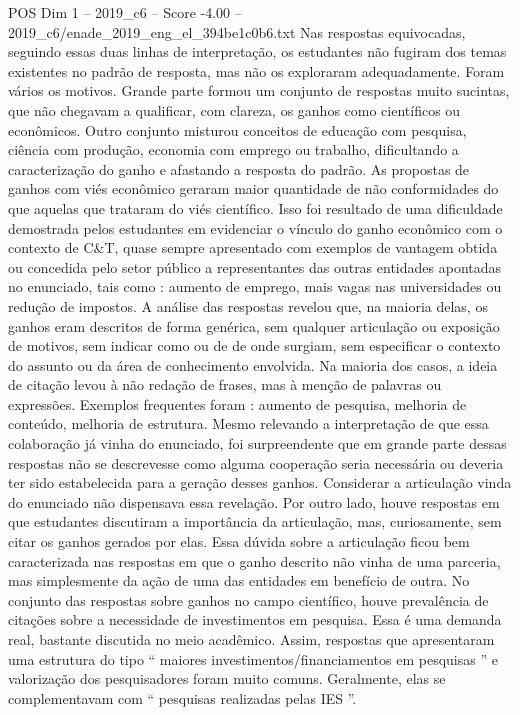 \begin{textsample}{POS Dim 1 – 2019\_c6 – Score -4.00 – 2019\_c6/enade\_2019\_eng\_el\_394be1c0b6.txt}
Nas respostas equivocadas, seguindo essas duas linhas de interpretação, os estudantes não fugiram dos temas existentes no padrão de resposta, mas não os exploraram adequadamente.
Foram vários os motivos.
Grande parte formou um conjunto de respostas muito sucintas, que não chegavam a qualificar, com clareza, os ganhos como científicos ou econômicos.
Outro conjunto misturou conceitos de educação com pesquisa, ciência com produção, economia com emprego ou trabalho, dificultando a caracterização do ganho e afastando a resposta do padrão.
As propostas de ganhos com viés econômico geraram maior quantidade de não conformidades do que aquelas que trataram do viés científico.
Isso foi resultado de uma dificuldade demostrada pelos estudantes em evidenciar o vínculo do ganho econômico com o contexto de C\&T, quase sempre apresentado com exemplos de vantagem obtida ou concedida pelo setor público a representantes das outras entidades apontadas no enunciado, tais como : aumento de emprego, mais vagas nas universidades ou redução de impostos.
A análise das respostas revelou que, na maioria delas, os ganhos eram descritos de forma genérica, sem qualquer articulação ou exposição de motivos, sem indicar como ou de de onde surgiam, sem especificar o contexto do assunto ou da área de conhecimento envolvida.
Na maioria dos casos, a ideia de citação levou à não redação de frases, mas à menção de palavras ou expressões.
Exemplos frequentes foram : aumento de pesquisa, melhoria de conteúdo, melhoria de estrutura.
Mesmo relevando a interpretação de que essa colaboração já vinha do enunciado, foi surpreendente que em grande parte dessas respostas não se descrevesse como alguma cooperação seria necessária ou deveria ter sido estabelecida para a geração desses ganhos.
Considerar a articulação vinda do enunciado não dispensava essa revelação.
Por outro lado, houve respostas em que estudantes discutiram a importância da articulação, mas, curiosamente, sem citar os ganhos gerados por elas.
Essa dúvida sobre a articulação ficou bem caracterizada nas respostas em que o ganho descrito não vinha de uma parceria, mas simplesmente da ação de uma das entidades em benefício de outra.
No conjunto das respostas sobre ganhos no campo científico, houve prevalência de citações sobre a necessidade de investimentos em pesquisa.
Essa é uma demanda real, bastante discutida no meio acadêmico.
Assim, respostas que apresentaram uma estrutura do tipo “ maiores investimentos/financiamentos em pesquisas ” e valorização dos pesquisadores foram muito comuns.
Geralmente, elas se complementavam com “ pesquisas realizadas pelas IES ”.

\end{textsample}
